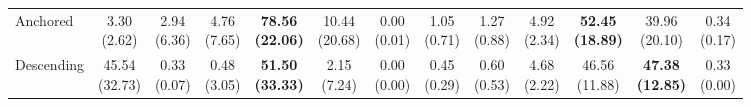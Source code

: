 {\begin{tabular}{l|cccccc|cccccc}
Anchored & \makecell{3.30 \\ (2.62)} & \makecell{2.94 \\ (6.36)} & \makecell{4.76 \\ (7.65)} & {\cellcolor[HTML]{C8E6C9}} \bfseries \makecell{78.56 \\ (22.06)} & \makecell{10.44 \\ (20.68)} & \makecell{0.00 \\ (0.01)} & \makecell{1.05 \\ (0.71)} & \makecell{1.27 \\ (0.88)} & \makecell{4.92 \\ (2.34)} & {\cellcolor[HTML]{C8E6C9}} \bfseries \makecell{52.45 \\ (18.89)} & \makecell{39.96 \\ (20.10)} & \makecell{0.34 \\ (0.17)} \\
Descending & \makecell{45.54 \\ (32.73)} & \makecell{0.33 \\ (0.07)} & \makecell{0.48 \\ (3.05)} & {\cellcolor[HTML]{C8E6C9}} \bfseries \makecell{51.50 \\ (33.33)} & \makecell{2.15 \\ (7.24)} & \makecell{0.00 \\ (0.00)} & \makecell{0.45 \\ (0.29)} & \makecell{0.60 \\ (0.53)} & \makecell{4.68 \\ (2.22)} & {\cellcolor[HTML]{C8E6C9}} \makecell{46.56 \\ (11.88)} & \bfseries \makecell{47.38 \\ (12.85)} & \makecell{0.33 \\ (0.00)} \\
\bottomrule
\end{tabular}
}%
